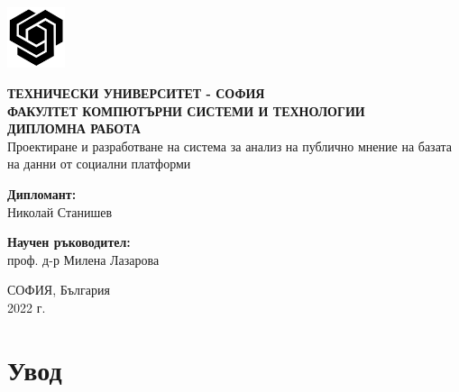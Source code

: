 \documentclass{article}
\begin{document}
\begin{titlepage}
  \vspace*{-3cm}\hspace*{15cm}\includegraphics[width=64px, keepaspectratio]{title-page/tu-logo.png}
  \begin{center}
    \textsc{{\textbf{ТЕХНИЧЕСКИ УНИВЕРСИТЕТ - СОФИЯ} \\}}
    \textsc{{\textbf{ФАКУЛТЕТ КОМПЮТЪРНИ СИСТЕМИ И ТЕХНОЛОГИИ} \\}}
    \vspace{40mm}
    \huge{\textbf{ДИПЛОМНА РАБОТА} \\}
    \vspace{15mm}
    \textnormal{ \LARGE{Проектиране и разработване на система за анализ на публично мнение на базата на данни от социални платформи\\}}
  \end{center}
  \vspace{20mm}
  \begin{minipage}[t]{0.47\textwidth}
    \textnormal{\large{\bf Дипломант:\\}}
    {\large Николай Станишев}
  \end{minipage}\hfill\begin{minipage}[t]{0.47\textwidth}
    \raggedleft
    \textnormal{\large{\bf Научен ръководител:\\}}
    {\large проф. д-р Милена Лазарова}
  \end{minipage}
  \vspace{50mm}

  \begin{center}
    {\large{СОФИЯ, България}}
    \\
    {\large{2022 г.}}
  \end{center}
\end{titlepage}





\newpage\tableofcontents

\newpage

\section{Увод}
\end{document}
